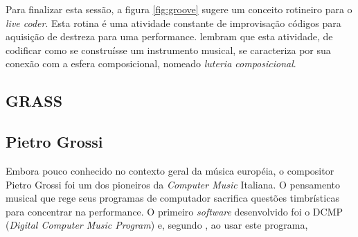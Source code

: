 Para finalizar esta sessão, a figura \autoref{fig:groove} sugere um conceito rotineiro para o \emph{live coder}. Esta rotina é uma atividade constante de improvisação códigos para aquisição de destreza para uma performance.  lembram que esta atividade, de codificar como se construísse um instrumento musical, se caracteriza por sua conexão com a esfera composicional, nomeado \emph{luteria composicional}.

\subsection{GRASS}

\subsection{Pietro Grossi}\label{sec:grossi}

Embora pouco conhecido no contexto geral da música européia, o compositor Pietro Grossi foi  um dos pioneiros da \emph{Computer Music} Italiana. O pensamento musical que rege seus programas de computador sacrifica questões timbrísticas para concentrar na performance. O primeiro \emph{software} desenvolvido foi o DCMP (\emph{Digital Computer Music Program}) e, segundo , ao usar este programa,

